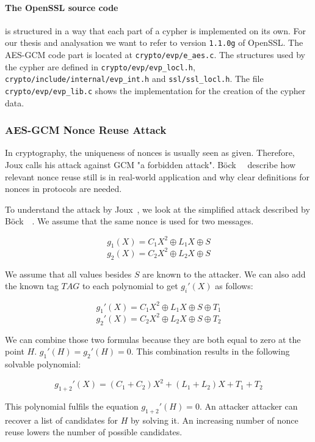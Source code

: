 \paragraph{The OpenSSL source code} is structured in a way that each part of a
cypher is implemented on its own. For our thesis and analysation we want to
refer to version \texttt{1.1.0g} of OpenSSL\cite{opensslsource}. The AES-GCM
code part is located at \texttt{crypto/evp/e\_aes.c}. The structures used by the
cypher are defined in \texttt{crypto/evp/evp\_locl.h},
\texttt{crypto/include/internal/evp\_int.h} and \texttt{ssl/ssl\_locl.h}. The
file \texttt{crypto/evp/evp\_lib.c} shows the implementation for the creation of
the cypher data.

\subsubsection{AES-GCM Nonce Reuse Attack}

In cryptography, the uniqueness of nonces is usually seen as given. Therefore,
Joux\cite{NISTGCMcomment} calls his attack against GCM "a forbidden attack".
Böck~\etal~\cite{gcmnonceattack} describe how relevant nonce reuse still is in
real-world application and why clear definitions for nonces in protocols
are needed.

To understand the attack by Joux~\cite{NISTGCMcomment}, we look at the
simplified attack described by Böck~\etal~\cite{gcmnonceattack}. We assume
that the same nonce is used for two messages.

\[g_1(X) = C{_{1}X^2 \oplus L_1X \oplus S}\]
\[g_2(X) = C{_{2}X^2 \oplus L_2X \oplus S}\]

We assume that all values besides $S$ are known to the attacker. We can also
add the known tag $TAG$ to each polynomial to get $g_i'(X)$ as follows:

\[g_1'(X) = C{_{1}X^2 \oplus L_1X \oplus S \oplus T_1}\]
\[g_2'(X) = C{_{2}X^2 \oplus L_2X \oplus S \oplus T_2}\]

We can combine those two formulas because they are both equal to zero at the
point $H$. $g_1'(H) = g_2'(H) = 0$. This combination results in the following
solvable polynomial:

\[g_{1+2}'(X) = (C_{1} + C_{2})X^2 + (L_1 + L_2)X + T_1 + T_2\]

This polynomial fulfils the equation $g_{1+2}'(H) = 0$. An attacker attacker
can recover a list of candidates for $H$ by solving it. An increasing number of
nonce reuse lowers the number of possible candidates.

